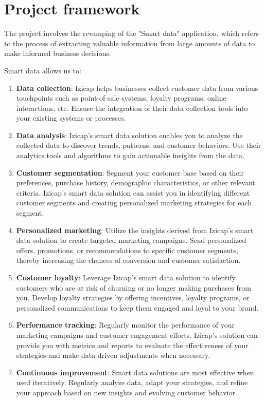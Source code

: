 \section{Project framework}

The project involves the revamping of the "Smart data" application, which refers to the process of extracting valuable information from large amounts of data to make informed business decisions.

Smart data allows us to:

\begin{enumerate}
\item \textbf{Data collection}: Izicap helps businesses collect customer data from various touchpoints such as point-of-sale systems, loyalty programs, online interactions, etc. Ensure the integration of their data collection tools into your existing systems or processes.
\item \textbf{Data analysis}: Izicap's smart data solution enables you to analyze the collected data to discover trends, patterns, and customer behaviors. Use their analytics tools and algorithms to gain actionable insights from the data.
\item \textbf{Customer segmentation}: Segment your customer base based on their preferences, purchase history, demographic characteristics, or other relevant criteria. Izicap's smart data solution can assist you in identifying different customer segments and creating personalized marketing strategies for each segment.
\item \textbf{Personalized marketing}: Utilize the insights derived from Izicap's smart data solution to create targeted marketing campaigns. Send personalized offers, promotions, or recommendations to specific customer segments, thereby increasing the chances of conversion and customer satisfaction.
\item \textbf{Customer loyalty}: Leverage Izicap's smart data solution to identify customers who are at risk of churning or no longer making purchases from you. Develop loyalty strategies by offering incentives, loyalty programs, or personalized communications to keep them engaged and loyal to your brand.
\item \textbf{Performance tracking}: Regularly monitor the performance of your marketing campaigns and customer engagement efforts. Izicap's solution can provide you with metrics and reports to evaluate the effectiveness of your strategies and make data-driven adjustments when necessary.
\item \textbf{Continuous improvement}: Smart data solutions are most effective when used iteratively. Regularly analyze data, adapt your strategies, and refine your approach based on new insights and evolving customer behavior.
\end{enumerate}

